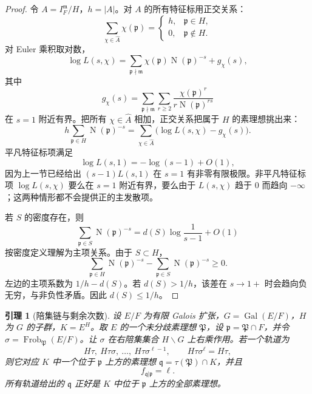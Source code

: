 \documentclass[11pt,a4paper,openany]{ctexbook}
\numberwithin{equation}{chapter}
\newcommand{\Gal}{\operatorname{Gal}}
\newcommand{\Nm}{\operatorname{N}}
\theoremstyle{plain}
\newtheorem{lemma}[theorem]{引理}
\theoremstyle{definition}
\theoremstyle{remark}
\begin{document}
\begin{proof}
令 $A=I_F^{\mathfrak m}/H$，$h=|A|$。对 $A$ 的所有特征标用正交关系：
\[
\sum_{\chi\in\widehat A}\chi(\mathfrak p)=
\begin{cases}
h,&\mathfrak p\in H,\\
0,&\mathfrak p\notin H.
\end{cases}
\]
对 Euler 乘积取对数，
\[
\log L(s,\chi)
=\sum_{\mathfrak p\nmid\mathfrak m}\chi(\mathfrak p)\Nm(\mathfrak p)^{-s}+g_\chi(s),
\]
其中
\[
g_\chi(s)=\sum_{\mathfrak p\nmid\mathfrak m}\sum_{r\ge2}
\frac{\chi(\mathfrak p)^r}{r\Nm(\mathfrak p)^{rs}}
\]
在 $s=1$ 附近有界。把所有 $\chi\in\widehat A$ 相加，正交关系把属于
$H$ 的素理想挑出来：
\[
h\sum_{\mathfrak p\in H}\Nm(\mathfrak p)^{-s}
=
\sum_{\chi\in\widehat A}\bigl(\log L(s,\chi)-g_\chi(s)\bigr).
\]
平凡特征标项满足
\[
\log L(s,1)= -\log(s-1)+O(1),
\]
因为上一节已经给出 $(s-1)L(s,1)$ 在 $s=1$ 有非零有限极限。非平凡特征标项
\(\log L(s,\chi)\) 要么在 $s=1$ 附近有界，要么由于 $L(s,\chi)$ 趋于 $0$ 而趋向
$-\infty$；这两种情形都不会提供正的主发散项。

若 $S$ 的密度存在，则
\[
\sum_{\mathfrak p\in S}\Nm(\mathfrak p)^{-s}
=d(S)\log\frac1{s-1}+O(1)
\]
按密度定义理解为主项关系。由于 $S\subset H$，
\[
\sum_{\mathfrak p\in H}\Nm(\mathfrak p)^{-s}
-\sum_{\mathfrak p\in S}\Nm(\mathfrak p)^{-s}\ge0 .
\]
左边的主项系数为 $1/h-d(S)$。若 $d(S)>1/h$，该差在 $s\to1+$ 时会趋向负无穷，与非负性矛盾。因此 $d(S)\le1/h$。
\end{proof}

\begin{lemma}[陪集链与剩余次数]
设 $E/F$ 为有限 Galois 扩张，$G=\Gal(E/F)$，$H$ 为 $G$ 的子群，$K=E^H$。取
$E$ 的一个未分歧素理想 $\mathfrak P$，设 $\mathfrak p=\mathfrak P\cap F$，并令
$\sigma=\operatorname{Frob}_{\mathfrak P}(E/F)$。让 $\sigma$ 在右陪集集合
$H\backslash G$ 上右乘作用。若一个轨道为
\[
H\tau,\ H\tau\sigma,\ \dots,\ H\tau\sigma^{\ell-1},
\qquad H\tau\sigma^\ell=H\tau,
\]
则它对应 $K$ 中一个位于 $\mathfrak p$ 上方的素理想
\(\mathfrak q=\tau(\mathfrak P)\cap K\)，并且
\[
f_{\mathfrak q|\mathfrak p}=\ell.
\]
所有轨道给出的 $\mathfrak q$ 正好是 $K$ 中位于 $\mathfrak p$ 上方的全部素理想。
\end{lemma}
\end{document}
